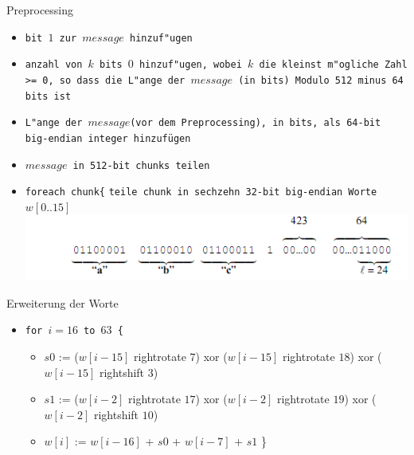 \documentclass[xcolor=x11names,compress]{beamer}
\renewcommand{\(}{\begin{columns}}
\renewcommand{\)}{\end{columns}}
\newcommand{\<}[1]{\begin{column}{#1}}
\renewcommand{\>}{\end{column}}
\begin{document}
\begin{frame}{Preprocessing}
\begin{itemize}
\item \texttt{bit $1$ zur $message$ hinzuf"ugen} \pause
\item \texttt{anzahl von $k$ bits $0$ hinzuf"ugen, wobei $k$ die kleinst m"ogliche Zahl >= 0, so dass die L"ange der $message$ (in bits) Modulo 512 minus 64 bits ist} \pause
\item \texttt{L"ange der $message$(vor dem Preprocessing), in bits, als 64-bit big-endian integer hinzufügen}\newline \newline \pause
\item \texttt{$message$ in 512-bit chunks teilen}
\item \texttt{foreach chunk\{}\newline
    \texttt{teile chunk in sechzehn 32-bit big-endian Worte $w[0..15]$}
\includegraphics[scale=0.52]{padding.png}
\end{itemize}




\end{frame}

\begin{frame}{Erweiterung der Worte}

\begin{itemize}

\item[]
\texttt{for $i=16$ to $63$ \{}
		 \begin{itemize}
		 \item[] $s0$ := ($w[i-15]$ rightrotate $7$) xor ($w[i-15]$ rightrotate $18$) xor ($w[i-15]$ rightshift $3$) \newline
        \item[] $s1$ := ($w[i-2]$ rightrotate $17$) xor ($w[i-2]$ rightrotate $19$) xor ($w[i-2]$ rightshift $10$) \newline
        \item[] $w[i]$ := $w[i-16]$ + $s0$ + $w[i-7]$ + $s1$ \newline \}
		 \end{itemize}
         
\end{itemize}


\end{frame}
\end{document}
